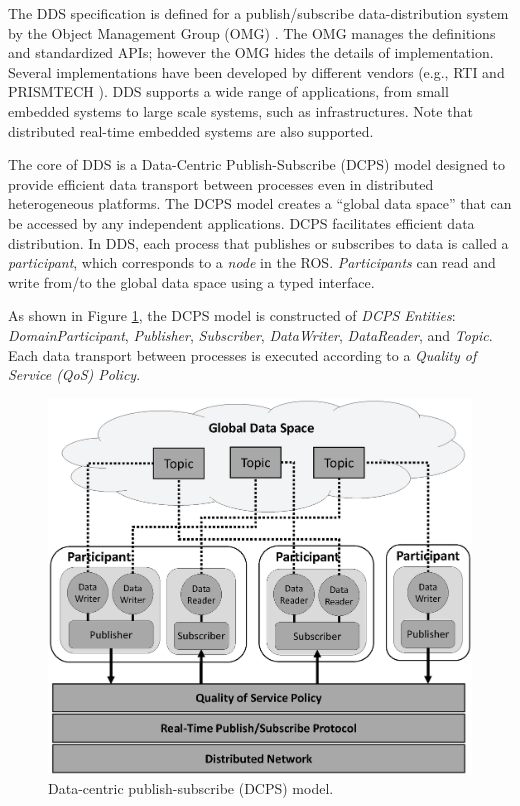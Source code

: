 \documentclass{sig-alternate-05-2015}
\begin{document}
The DDS specification \cite{dds1.4} is defined for a publish/subscribe data-distribution system by the Object Management Group (OMG) \cite{omg}. 
The OMG manages the definitions and standardized APIs; however the OMG hides the details of implementation. Several implementations have been developed by different vendors (e.g., RTI \cite{rti_connext} and PRISMTECH \cite{ospl_dds_community}).
DDS supports a wide range of applications, from small embedded systems to large scale systems, such as infrastructures. 
Note that distributed real-time embedded systems are also supported.

The core of DDS is a Data-Centric Publish-Subscribe (DCPS) model designed to provide efficient data transport between processes even in distributed heterogeneous platforms. 
The DCPS model creates a ``global data space'' that can be accessed by any independent applications. 
DCPS facilitates efficient data distribution.
In DDS, each process that publishes or subscribes to data is called a \emph{participant}, which corresponds to a \emph{node} in the ROS. 
\emph{Participants} can read and write from/to the global data space using a typed interface.

As shown in Figure \ref{fig:orgparagraph3}, the DCPS model is constructed of \emph{DCPS Entities}: \emph{DomainParticipant}, \emph{Publisher}, \emph{Subscriber}, \emph{DataWriter}, \emph{DataReader}, and \emph{Topic}. 
Each data transport between processes is executed according to a \emph{Quality of Service (QoS) Policy}.

\begin{figure}[t]
\centering
\includegraphics[width=0.8\linewidth]{../figure/DDS_model.eps}
\caption{\label{fig:orgparagraph3}
Data-centric publish-subscribe (DCPS) model.}
\end{figure}   
\end{document}

